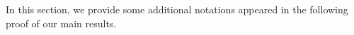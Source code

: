 In this section, we provide some additional notations appeared in the following proof of our main results.

